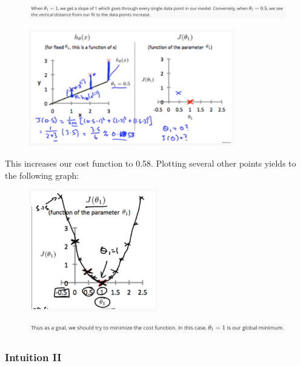 \documentclass[12pt, A4,onecolumn]{article} %
\begin{document}
\begin{figure}[H]
	\centering
	\includegraphics[width=1\textwidth]{./Imagenes/costFunc5}
\end{figure}	

\begin{figure}[H]
	\centering
	\includegraphics[width=0.8\textwidth]{./Imagenes/costFunc6}
\end{figure}	

This increases our cost function to 0.58. Plotting several other points yields to the following graph:

\begin{figure}[H]
	\centering
	\includegraphics[width=0.5\textwidth]{./Imagenes/costFunc7}
\end{figure}	

\begin{figure}[H]
	\centering
	\includegraphics[width=1\textwidth]{./Imagenes/costFunc8}
\end{figure}	

\subsubsection{Intuition II}
\end{document}
